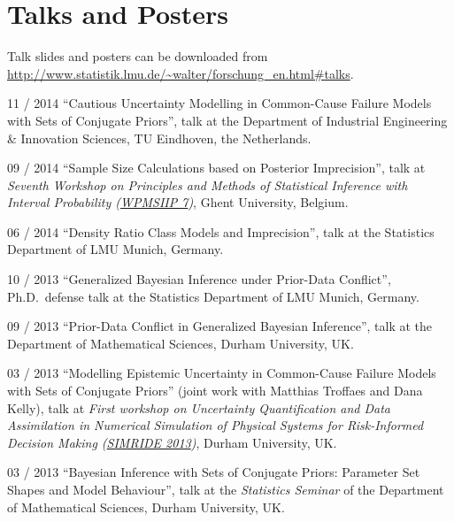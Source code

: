 \documentclass[a4paper]{simplecv}
\begin{document}
\section{Talks and Posters}
\label{talks}

Talk slides and posters can be downloaded from \url{http://www.statistik.lmu.de/~walter/forschung_en.html#talks}.

\begin{topic}
\item[11 / 2014] ``Cautious Uncertainty Modelling in Common-Cause Failure Models with Sets of Conjugate Priors'', talk at
                 the Department of Industrial Engineering \& Innovation Sciences, TU Eindhoven, the Netherlands.
\item[09 / 2014] ``Sample Size Calculations based on Posterior Imprecision'', talk at
                 \emph{Seventh Workshop on Principles and Methods of Statistical Inference with Interval Probability (\href{http://users.ugent.be/~slopatat/wpmsiip2014/index.html}{WPMSIIP 7})},
                 Ghent University, Belgium.

\item[06 / 2014] ``Density Ratio Class Models and Imprecision'',
                 talk at the Statistics Department of LMU Munich, Germany.

\item[10 / 2013] ``Generalized Bayesian Inference under Prior-Data Conflict'', Ph.D.\ defense talk at
                 the Statistics Department of LMU Munich, Germany.

\item[09 / 2013] ``Prior-Data Conflict in Generalized Bayesian Inference'', talk at
                 the Department of Mathematical Sciences, Durham University, UK.

\item[03 / 2013] ``Modelling Epistemic Uncertainty in Common-Cause Failure Models with Sets of Conjugate Priors''
                 (joint work with Matthias Troffaes and Dana Kelly), talk at
                 \emph{First workshop on Uncertainty Quantification and Data Assimilation in Numerical Simulation of Physical Systems
                 for Risk-Informed Decision Making (\href{http://www.maths.dur.ac.uk/users/matthias.troffaes/simride2013/}{SIMRIDE 2013})}, Durham University, UK.

\item[03 / 2013] ``Bayesian Inference with Sets of Conjugate Priors: Parameter Set Shapes and Model Behaviour'', talk at the
                 \emph{Statistics Seminar} of the Department of Mathematical Sciences, Durham University, UK.


\end{topic}
\end{document}
